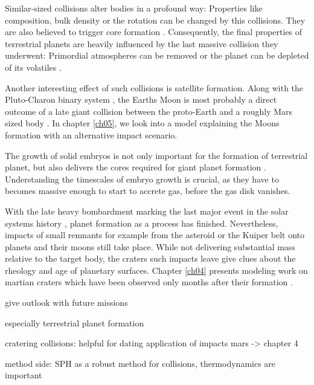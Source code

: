 Similar-sized collisions alter bodies in a profound way: Properties like composition, bulk density \citep{Benz:1988p3336} or the rotation can be changed by this collisions. They are also believed to trigger core formation \citep{1992Icar..100..326T}. Consequently, the final properties of terrestrial planets are heavily influenced by the last massive collision they underwent: Primordial atmospheres can be removed \citep{2002DPS....34.2804A} or the planet can be depleted of its volatiles \citep{2001E&PSL.192..545H}.

Another interesting effect of such collisions is satellite formation. Along with the Pluto-Charon binary system \citep{Canup:2005p1987}, the Earths Moon is most probably a direct outcome of a late giant collision between the proto-Earth and a roughly Mars sized body \citep{1975Icar...24..504H, 1976LPI.....7..120C, 1987Icar...71...30B, Canup:2001p1861}. In chapter \ref{ch05}, we look into a model explaining the Moons formation with an alternative impact scenario.

The growth of solid embryos is not only important for the formation of terrestrial planet, but also delivers the cores required for giant planet formation \citep{1996Icar..124...62P}. Understanding the timescales of embryo growth is crucial, as they have to becomes massive enough to start to accrete gas, before the gas disk vanishes. 

With the late heavy bombardment marking the last major event in the solar systems history \citep{2005Natur.435..466G}, planet formation as a process has finished. Nevertheless, impacts of small remnants for example from the asteroid or the Kuiper belt onto planets and their moons still take place. While not delivering substantial mass relative to the target body, the craters such impacts leave give clues about the rheology and age of planetary surfaces. Chapter \ref{ch04} presents modeling work on martian craters which have been observed only months after their formation \cite{2009Sci...325.1674B}. 

give outlook with future missions




especially terrestrial planet formation 

cratering collisions: helpful for dating 
application of impacts mars -> chapter 4


method side: SPH as a robust method for collisions, thermodynamics are important


